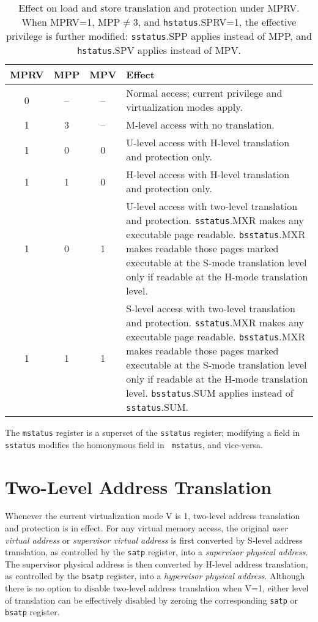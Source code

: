 \begin{table*}[h!]
\begin{center}
\begin{tabular}{|c|c|c||p{5in}|}
  \hline
   MPRV & MPP & MPV & Effect \\ \hline \hline
   0    & --  & -- & Normal access; current privilege and virtualization modes apply. \\ \hline
   1    & 3   & -- & M-level access with no translation. \\ \hline
   1    & 0   & 0  & U-level access with H-level translation and protection only. \\ \hline
   1    & 1   & 0  & H-level access with H-level translation and protection only.  \\ \hline
   1    & 0   & 1  & U-level access with two-level translation and protection. {\tt sstatus}.MXR makes any executable page readable.  {\tt bsstatus}.MXR makes readable those pages marked executable at the S-mode translation level only if readable at the H-mode translation level. \\ \hline
   1    & 1   & 1  & S-level access with two-level translation and protection. {\tt sstatus}.MXR makes any executable page readable.  {\tt bsstatus}.MXR makes readable those pages marked executable at the S-mode translation level only if readable at the H-mode translation level. {\tt bsstatus}.SUM applies instead of {\tt sstatus}.SUM. \\ \hline
 \end{tabular}
\end{center}
\caption{Effect on load and store translation and protection under MPRV.  When MPRV=1, MPP$\neq$3, and {\tt hstatus}.SPRV=1, the effective privilege is further modified: {\tt sstatus}.SPP applies instead of MPP, and {\tt hstatus}.SPV applies instead of MPV.}
\label{h-mprv}
\end{table*}

The {\tt mstatus} register is a superset of the {\tt sstatus} register;
modifying a field in {\tt sstatus} modifies the homonymous field in {\tt
mstatus}, and vice-versa.

\section{Two-Level Address Translation}

Whenever the current virtualization mode V is 1, two-level address translation
and protection is in effect.  For any virtual memory access, the original {\em
user virtual address} or {\em supervisor virtual address} is first converted
by S-level address translation, as controlled by the {\tt satp} register, into
a {\em supervisor physical address}.  The supervisor physical address is then
converted by H-level address translation, as controlled by the {\tt bsatp}
register, into a {\em hypervisor physical address}.
Although there is no option to disable two-level address translation when V=1,
either level of translation can be effectively disabled by zeroing the
corresponding {\tt satp} or {\tt bsatp} register.

